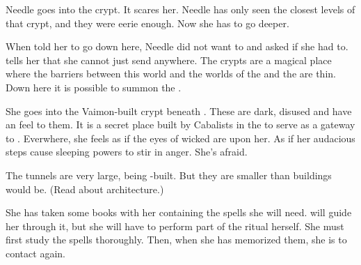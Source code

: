 \begin{comment}
  \section{Needle goes into the crypt}
\end{comment}
\new 
Needle goes into the crypt. 
It scares her. 
Needle has only seen the closest levels of that crypt, and they were eerie enough.
Now she has to go deeper. 

When \Achsah told her to go down here, Needle did not want to and asked if she had to.
\Achsah tells her that she cannot just send \banes anywhere.
The crypts are a magical place where the barriers between this world and the worlds of the \resphain and the \banes are thin. 
Down here it is possible to summon the \banes. 

She goes into the Vaimon-built crypt beneath \CastlePelidor. 
These are dark, disused and have an  feel to them. 
It is a secret place built by Cabalists in the \VaimonCaliphate to serve as a gateway to \Nyx. 
Everwhere, she feels as if the eyes of wicked \Qliphoth{} are upon her. 
As if her audacious steps cause sleeping powers to stir in anger. 
She's afraid. 

The tunnels are very large, being \resphan-built. 
But they are smaller than \ophidian buildings would be.
(Read about {\resphan architecture}.)


She has taken some books with her containing the spells she will need.
\Achsah will guide her through it, but she will have to perform part of the ritual herself. 
She must first study the spells thoroughly.
Then, when she has memorized them, she is to contact \Achsah again. 

